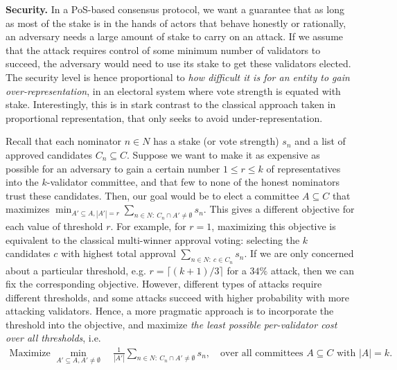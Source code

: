 \textbf{Security.}
In a PoS-based consensus protocol, we want a guarantee that as long as most of the stake is in the hands of actors that behave honestly or rationally, an adversary needs a large amount of stake to carry on an attack. 
If we assume that the attack requires control of some minimum number of validators to succeed, the adversary would need to use its stake to get these validators elected. The security level is hence proportional to \emph{how difficult it is for an entity to gain over-representation}, in an electoral system where vote strength is equated with stake. 
Interestingly, this is in stark contrast to the classical approach taken in proportional representation, that only seeks to avoid under-representation. 

Recall that each nominator $n\in N$ has a stake (or vote strength) $s_n$ and a list of approved candidates $C_n\subseteq C$. 
Suppose we want to make it as expensive as possible for an adversary to gain a certain number $1\leq r\leq k$ of representatives into the $k$-validator committee, and that few to none of the honest nominators trust these candidates. Then, our goal would be to elect a committee $A\subseteq C$ that maximizes $\min_{A'\subseteq A, |A'|=r} \sum_{n\in N: \ C_n\cap A'\neq \emptyset} s_n$.
This gives a different objective for each value of threshold $r$. 
For example, for $r=1$, maximizing this objective is equivalent to the classical multi-winner approval voting: selecting the $k$ candidates $c$ with highest total approval $\sum_{n\in N: \ c\in C_n} s_n$. 
If we are only concerned about a particular threshold, e.g. $r=\lceil(k+1)/3\rceil$ for a $34\%$ attack, then we can fix the corresponding objective. However, different types of attacks require different thresholds, and some attacks succeed with higher probability with more attacking validators. Hence, a more pragmatic approach is to incorporate the threshold into the objective, and maximize \emph{the least possible per-validator cost over all thresholds}, i.e.  
\begin{align}\label{eq:security}
    \text{Maximize } \min_{A'\subseteq A, A'\neq \emptyset} \quad \frac{1}{|A'|} \sum_{n\in N: \ C_n\cap A' \neq \emptyset} s_n, \quad \text{over all committees $A\subseteq C$ with $|A|=k$}.
\end{align}

